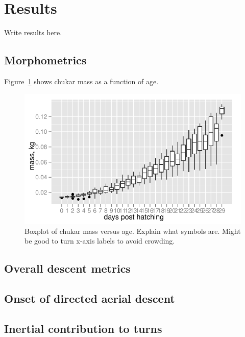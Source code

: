 \section{Results}
\label{sec:1results}
Write results here. 

\subsection{Morphometrics}
Figure~\ref{fig:1mass} shows chukar mass as a function of age.  

\begin{figure}
\begin{center}
\includegraphics{figures/chukar-mass-boxplot.pdf}
\end{center}
\caption{Boxplot of chukar mass versus age. Explain what symbols are. Might be good to turn x-axis labels to avoid crowding.}
\label{fig:1mass}
\end{figure}

\subsection{Overall descent metrics}
\subsection{Onset of directed aerial descent}
\subsection{Inertial contribution to turns}


